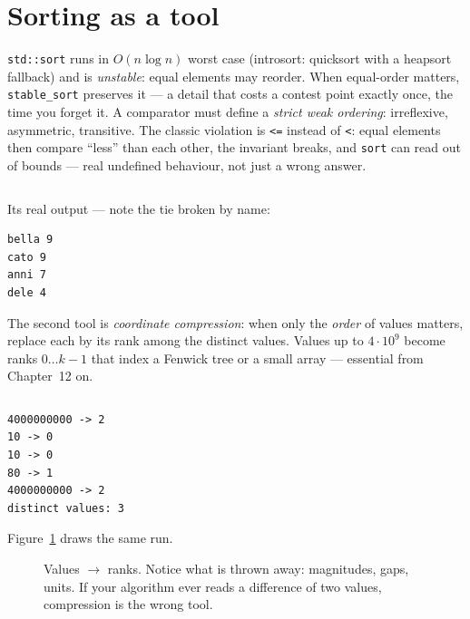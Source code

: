 \section{Sorting as a tool}
\label{sec:sorting}

\texttt{std::sort} runs in $O(n\log n)$ worst case (introsort: quicksort
with a heapsort fallback) and is \emph{unstable}: equal elements may
reorder. When equal-order matters, \texttt{stable\_sort} preserves it ---
a detail that costs a contest point exactly once, the time you forget it.
A comparator must define a \emph{strict weak ordering}: irreflexive,
asymmetric, transitive. The classic violation is \texttt{<=} instead of
\texttt{<}: equal elements then compare ``less'' than each other, the
invariant breaks, and \texttt{sort} can read out of bounds --- real
undefined behaviour, not just a wrong answer.

\begin{lstlisting}[label={lst:sortcmp},
caption={\texttt{code/sort\_cmp.cpp}: lambda comparator plus structured
bindings. The comparator asks one question --- ``does $a$ come before
$b$?'' --- never ``are they equal?''}]
\end{lstlisting}

Its real output --- note the tie broken by name:
\begin{lstlisting}[numbers=none]
bella 9
cato 9
anni 7
dele 4
\end{lstlisting}

The second tool is \emph{coordinate compression}: when only the \emph{order} of values matters, replace each
by its rank among the distinct values. Values up to $4\cdot10^9$ become
ranks $0\dots k{-}1$ that index a Fenwick tree or a small array ---
essential from Chapter~12 on.

\begin{lstlisting}[label={lst:compress},
caption={\texttt{code/compress\_demo.cpp} using
\texttt{code/lib/compress.h}. Ranks preserve every comparison
($<$, $=$, $>$); nothing else survives, by design.}]
\end{lstlisting}

\begin{lstlisting}[numbers=none]
4000000000 -> 2
10 -> 0
10 -> 0
80 -> 1
4000000000 -> 2
distinct values: 3
\end{lstlisting}
Figure~\ref{fig:compress} draws the same run.

\begin{figure}[ht]\centering

\caption{Values $\to$ ranks. Notice what is thrown away: magnitudes,
gaps, units. If your algorithm ever reads a difference of two values,
compression is the wrong tool.}
\label{fig:compress}
\end{figure}

